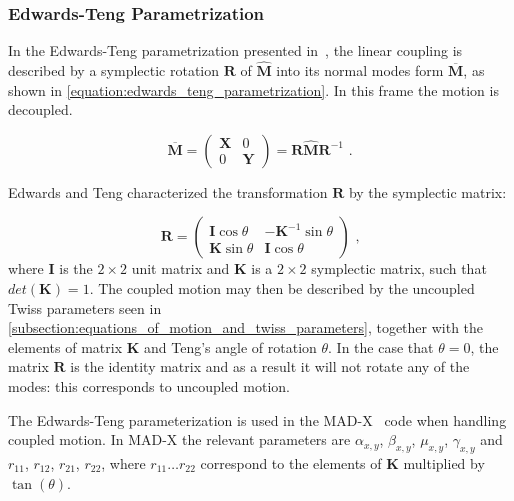 \subsubsection*{Edwards-Teng Parametrization}

In the Edwards-Teng parametrization presented in~\cite{IEEE:Edwards:Parametrization_Linear_Coupled_Motion}, the linear coupling is described by a symplectic rotation \(\mathbf{R}\) of \(\hat{\mathbf{M}}\) into its normal modes form \(\overline{\mathbf{M}}\), as shown in \cref{equation:edwards_teng_parametrization}.
In this frame the motion is decoupled.

\begin{equation}
    \overline{\mathbf{M}} = \left(
        \begin{array}{cc}
            \mathbf{X} & 0 \\
            0 & \mathbf{Y}
    \end{array} \right) = \mathbf{R} \hat{\mathbf{M}} \mathbf{R}^{-1} \text{ .}
    \label{equation:edwards_teng_parametrization}
\end{equation}

Edwards and Teng characterized the transformation \(\mathbf{R}\) by the symplectic matrix:

\begin{equation}
    \mathbf{R} =\left(
        \begin{array}{cc}
            \mathbf{I} \cos \theta & -\mathbf{K}^{-1} \sin \theta \\
            \mathbf{K} \sin \theta & \mathbf{I} \cos \theta
    \end{array} \right) \text{ ,}
    \label{equation:edwards_teng_rotation_matrix}
\end{equation}
where \(\mathbf{I}\) is the \(2 \times 2\) unit matrix and \(\mathbf{K}\) is a \(2 \times 2\) symplectic matrix, such that \(det(\mathbf{K}) = 1\).
The coupled motion may then be described by the uncoupled Twiss parameters seen in \cref{subsection:equations_of_motion_and_twiss_parameters}, together with the elements of matrix \(\mathbf{K}\) and Teng's angle of rotation \(\theta\).
In the case that \(\theta = 0\), the matrix \(\mathbf{R}\) is the identity matrix and as a result it will not rotate any of the modes: this corresponds to uncoupled motion.

The Edwards-Teng parameterization is used in the MAD-X~\cite{CODE:MADX_guide} code when handling coupled motion.
In MAD-X the relevant parameters are \(\alpha_{x, y}\), \(\beta_{x, y}\), \(\mu_{x, y}\), \(\gamma_{x, y}\) and \(r_{11}\), \(r_{12}\), \(r_{21}\), \(r_{22}\), where \(r_{11} \ldots r_{22}\) correspond to the elements of \(\mathbf{K}\) multiplied by \(\tan(\theta)\).

